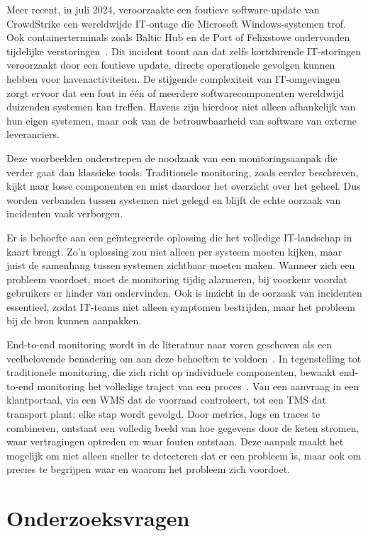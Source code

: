 Meer recent, in juli 2024, veroorzaakte een foutieve software-update van CrowdStrike een wereldwijde IT-outage die Microsoft Windows-systemen trof. Ook containerterminals zoals Baltic Hub en de Port of Felixstowe ondervonden tijdelijke verstoringen~\autocite{Mandra2024}. Dit incident toont aan dat zelfs kortdurende IT-storingen veroorzaakt door een foutieve update, directe operationele gevolgen kunnen hebben voor havenactiviteiten. De stijgende complexiteit van IT-omgevingen zorgt ervoor dat een fout in één of meerdere softwarecomponenten wereldwijd duizenden systemen kan treffen. Havens zijn hierdoor niet alleen afhankelijk van hun eigen systemen, maar ook van de betrouwbaarheid van software van externe leveranciers.

Deze voorbeelden onderstrepen de noodzaak van een monitoringsaanpak die verder gaat dan klassieke tools. Traditionele monitoring, zoals eerder beschreven, kijkt naar losse componenten en mist daardoor het overzicht over het geheel. Dus worden verbanden tussen systemen niet gelegd en blijft de echte oorzaak van incidenten vaak verborgen.

Er is behoefte aan een geïntegreerde oplossing die het volledige IT-landschap in kaart brengt. Zo'n oplossing zou niet alleen per systeem moeten kijken, maar juist de samenhang tussen systemen zichtbaar moeten maken. Wanneer zich een probleem voordoet, moet de monitoring tijdig alarmeren, bij voorkeur voordat gebruikers er hinder van ondervinden. Ook is inzicht in de oorzaak van incidenten essentieel, zodat IT-teams niet alleen symptomen bestrijden, maar het probleem bij de bron kunnen aanpakken.

End-to-end monitoring wordt in de literatuur naar voren geschoven als een veelbelovende benadering om aan deze behoeften te voldoen~\autocite{Mireles2024}. In tegenstelling tot traditionele monitoring, die zich richt op individuele componenten, bewaakt end-to-end monitoring het volledige traject van een proces~\autocite{Saminathan2021}. Van een aanvraag in een klantportaal, via een WMS dat de voorraad controleert, tot een TMS dat transport plant: elke stap wordt gevolgd. Door metrics, logs en traces te combineren, ontstaat een volledig beeld van hoe gegevens door de keten stromen, waar vertragingen optreden en waar fouten ontstaan. Deze aanpak maakt het mogelijk om niet alleen sneller te detecteren dat er een probleem is, maar ook om precies te begrijpen waar en waarom het probleem zich voordoet.

\section{Onderzoeksvragen}

